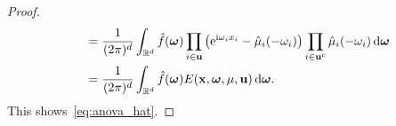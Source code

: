 \documentclass[10pt,a4paper]{amsart}
\newcommand{\R}{\ensuremath{\mathbb{R}}}
\renewcommand{\d}{\, \mathrm{d}}
\newcommand{\e}{\mathrm{e}}
\newcommand{\im}{\mathrm{i}}
\renewcommand{\vec}[1]{\ensuremath \mathbf{\boldsymbol{#1}}}
\newcommand{\w}{\ensuremath{\vec \omega}}
\newcommand{\x}{\ensuremath{\vec x}}
\begin{document}
\begin{proof}
\begin{align*}
&\quad=\frac{1}{(2\pi)^d}\int_{\R^d} \hat f(\w) \prod_{i\in \vec u} \left(\e^{\im \omega_i x_i}- \hat{\mu}_i(-\omega_i)\right) \prod_{i \in \vec u^c} \hat{\mu}_i(-\omega_i) \d \w\\
&\quad=\frac{1}{(2\pi)^d}\int_{\R^d} \hat f(\w) E(\x,\w,\mu,\vec u) \d \w.
\end{align*}
This shows~\eqref{eq:anova_hat}. 
\end{proof}
\end{document}
